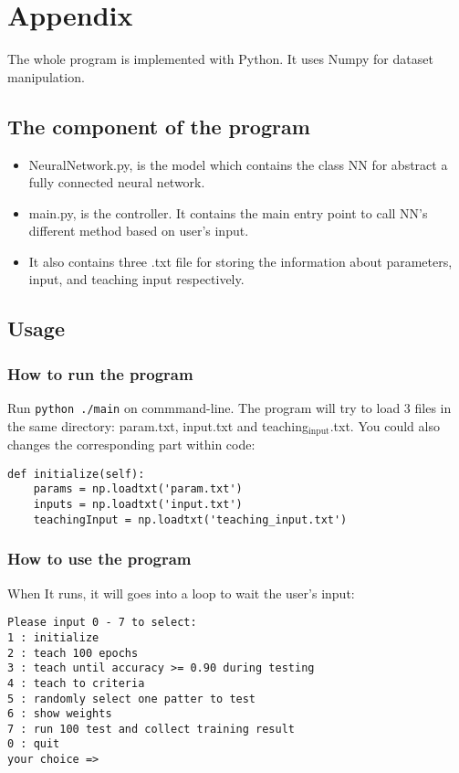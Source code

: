 \documentclass[11pt]{article}
\begin{document}
\section{Appendix}
\label{sec-5}
The whole program is implemented with Python. It uses Numpy for dataset manipulation.
\subsection{The component of the program}
\label{sec-5-1}
\begin{itemize}
\item NeuralNetwork.py, is the model which contains the class NN for abstract a fully connected neural network.
\item main.py, is the controller. It contains the main entry point to call NN's different method based on user's input.
\item It also contains three .txt file for storing the information about parameters, input, and teaching input respectively.
\end{itemize}
\subsection{Usage}
\label{sec-5-2}
\subsubsection{How to run the program}
\label{sec-5-2-1}
Run \texttt{python ./main} on commmand-line.
The program will try to load 3 files in the same directory: param.txt, input.txt and teaching$_{\text{input}}$.txt. You could also changes the corresponding part within code:
\begin{verbatim}
def initialize(self):
    params = np.loadtxt('param.txt')
    inputs = np.loadtxt('input.txt')
    teachingInput = np.loadtxt('teaching_input.txt')
\end{verbatim}
\subsubsection{How to use the program}
\label{sec-5-2-2}
When It runs, it will goes into a loop to wait the user's input:
\begin{verbatim}
Please input 0 - 7 to select:
1 : initialize
2 : teach 100 epochs
3 : teach until accuracy >= 0.90 during testing
4 : teach to criteria
5 : randomly select one patter to test
6 : show weights
7 : run 100 test and collect training result
0 : quit
your choice =>
\end{verbatim}
\end{document}
